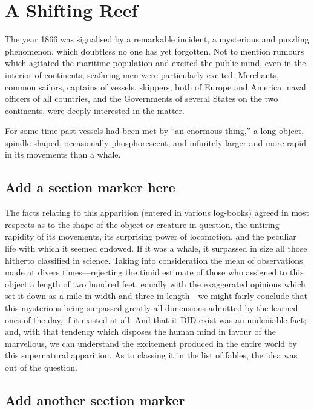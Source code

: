 \chapter{A Shifting Reef}

The year 1866 was signalised by a remarkable incident, a mysterious
and puzzling phenomenon, which doubtless no one has yet forgotten.
Not to mention rumours which agitated the maritime population
and excited the public mind, even in the interior of continents,
seafaring men were particularly excited.  Merchants, common sailors,
captains of vessels, skippers, both of Europe and America,
naval officers\cite{article-full} of all countries, and the 
Governments of several States
on the two continents, were deeply interested in the matter.

For some time past vessels had been met by ``an enormous thing,''
a long object, spindle-shaped, occasionally phosphorescent,
and infinitely larger and more rapid in its movements than a whale.

\section{Add a section marker here}

The facts relating to this apparition (entered in various log-books)
agreed in most respects as to the shape of the object or creature in question,
the untiring rapidity of its movements, its surprising power of locomotion,
and the peculiar life with which it seemed endowed.  If it was a whale,
it surpassed in size all those hitherto classified in science.
Taking into consideration the mean of observations made at divers 
times---rejecting the timid estimate of those who assigned to this object
a length of two hundred feet, equally with the exaggerated opinions
which set it down as a mile in width and three in length---we might fairly
conclude that this mysterious being surpassed greatly all dimensions
admitted by the learned ones of the day, if it existed at all.
And that it DID exist was an undeniable fact; and, with that tendency
which disposes the human mind in favour of the marvellous, we can understand
the excitement produced in the entire world by this supernatural apparition.
As to classing it in the list of fables, the idea was out of the question.

\section{Add another section marker}

